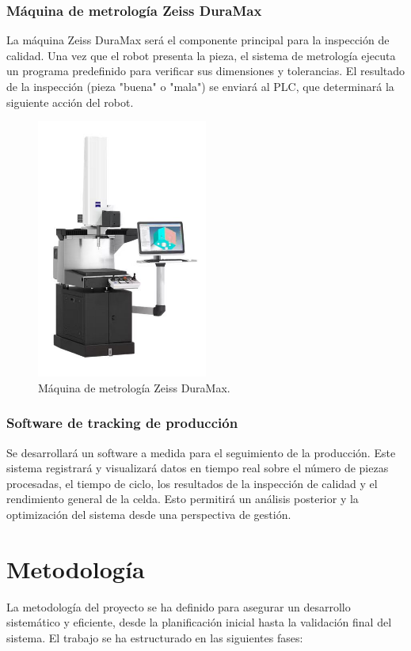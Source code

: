 \documentclass[12pt, a4paper]{article}
\begin{document}
\subsubsection{Máquina de metrología Zeiss DuraMax}
La máquina Zeiss DuraMax será el componente principal para la inspección de calidad. Una vez que el robot presenta la pieza, el sistema de metrología ejecuta un programa predefinido para verificar sus dimensiones y tolerancias. El resultado de la inspección (pieza "buena" o "mala") se enviará al PLC, que determinará la siguiente acción del robot.

\begin{figure}[h!]
    \centering
    \includegraphics[width=0.5\textwidth]{duramax.JPG}
    \caption{Máquina de metrología Zeiss DuraMax.}
    \label{fig:duramax}
\end{figure}

\subsubsection{Software de tracking de producción}
Se desarrollará un software a medida para el seguimiento de la producción. Este sistema registrará y visualizará datos en tiempo real sobre el número de piezas procesadas, el tiempo de ciclo, los resultados de la inspección de calidad y el rendimiento general de la celda. Esto permitirá un análisis posterior y la optimización del sistema desde una perspectiva de gestión.

\section{Metodología}
La metodología del proyecto se ha definido para asegurar un desarrollo sistemático y eficiente, desde la planificación inicial hasta la validación final del sistema. El trabajo se ha estructurado en las siguientes fases:
\end{document}
